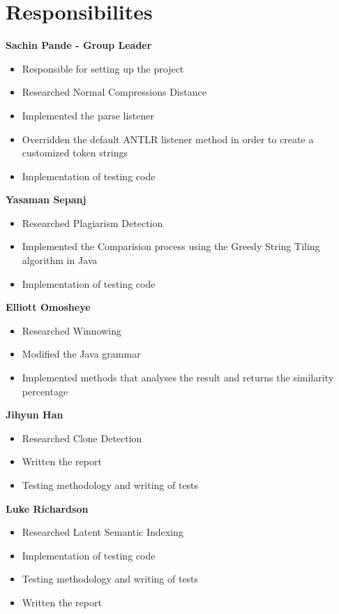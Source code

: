 \section{Responsibilites}
\textbf{Sachin Pande - Group Leader}
\begin{itemize}
\item Responsible for setting up the project
\item Researched Normal Compressions Distance
\item Implemented the parse listener
\item Overridden the default ANTLR listener method in order to create a customized token strings
\item Implementation of testing code\\
\end{itemize}
\textbf{Yasaman Sepanj}
\begin{itemize}
\item Researched Plagiarism Detection
\item Implemented the Comparision process using the Greedy String Tiling algorithm in Java
\item Implementation of testing code\\
\end{itemize}
\textbf{Elliott Omosheye}
\begin{itemize}
\item Researched Winnowing
\item Modified the Java grammar
\item Implemented methods that analyses the result and returns the similarity percentage\\
\end{itemize}
\textbf{Jihyun Han}
\begin{itemize}
\item Researched Clone Detection
\item Written the report
\item Testing methodology and writing of tests\\
\end{itemize}
\textbf{Luke Richardson}
\begin{itemize}
\item Researched Latent Semantic Indexing
\item Implementation of testing code
\item Testing methodology and writing of tests
\item Written the report
\end{itemize}
\break